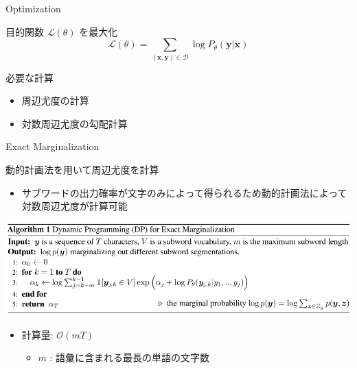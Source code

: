 \documentclass[unicode, 12pt, xdvipdfmx, aspectratio=43]{beamer}
\begin{document}
\begin{frame}[label={sec:org38d0a8f}]{Optimization}
\begin{block}{目的関数 \(\mathcal{L}(\theta)\) を最大化}
\begin{equation*}
  \mathcal{L}(\theta) = \sum_{(\boldsymbol{x}, \boldsymbol{y}) \in \mathcal{D}} \log P_\theta (\boldsymbol{y} | \boldsymbol{x})
\end{equation*}
\end{block}

\begin{block}{必要な計算}
\begin{itemize}
\item 周辺尤度の計算
\item 対数周辺尤度の勾配計算
\end{itemize}
\end{block}
\end{frame}

\begin{frame}[label={sec:orgf1f277c}]{Exact Marginalization}
\begin{block}{動的計画法を用いて周辺尤度を計算}
\begin{itemize}
\item サブワードの出力確率が文字のみによって得られるため動的計画法によって対数周辺尤度が計算可能
\end{itemize}
\vspace{-0.5cm}

\begin{center}
\includegraphics[width=1.05\linewidth]{./figure/Algorithm1.pdf}
\end{center}
\vspace{-0.5cm}
\begin{itemize}
\item 計算量:  \(\mathcal{O}(mT)\)
\begin{itemize}
\item \(m\) : 語彙に含まれる最長の単語の文字数
\end{itemize}
\end{itemize}
\end{block}
\end{frame}
\end{document}
